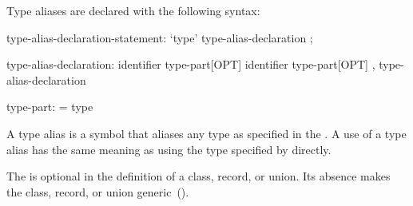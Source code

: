 Type aliases are declared with the following syntax:
\begin{syntax}
type-alias-declaration-statement:
  `type' type-alias-declaration ;

type-alias-declaration:
  identifier type-part[OPT]
  identifier type-part[OPT] , type-alias-declaration

type-part:
  = type
\end{syntax}
A type alias is a symbol that aliases any type as specified in the
.  A use of a type alias has the same meaning as using
the type specified by  directly.

The  is optional in the definition of a class, record,
or union.  Its absence makes the class, record, or union
generic~().
